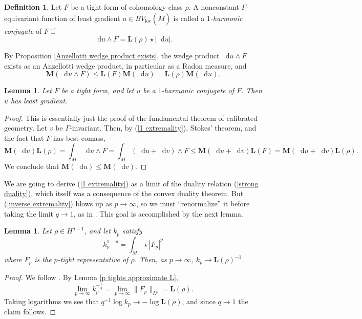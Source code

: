 \documentclass[reqno,11pt]{amsart}
\newcommand*\dif{\mathop{}\!\mathrm{d}}
\newcommand{\Mass}{\mathbf M}
\newcommand{\Comass}{\mathbf L}
\newcommand{\dfn}[1]{\emph{#1}\index{#1}}
\newcommand{\loc}{\mathrm{loc}}
\newtheorem{lemma}[theorem]{Lemma}
\theoremstyle{definition}
\newtheorem{definition}[theorem]{Definition}
\numberwithin{equation}{section}
\begin{document}
\begin{definition}
Let $F$ be a tight form of cohomology class $\rho$.
A nonconstant $\Gamma$-equivariant function of least gradient $u \in BV_\loc(\tilde M)$ is called a \dfn{$1$-harmonic conjugate} of $F$ if
\begin{equation}\label{1 extremality}
\dif u \wedge F = \Comass(\rho) \star |\dif u|.
\end{equation}
\end{definition}

By Proposition \ref{Anzellotti wedge product exists}, the wedge product $\dif u \wedge F$ exists as an Anzellotti wedge product, in particular as a Radon measure, and
$$\Mass(\dif u \wedge F) \leq \Comass(F) \Mass(\dif u) = \Comass(\rho) \Mass(\dif u).$$

\begin{lemma}\label{1 extremality implies least gradient}
Let $F$ be a tight form, and let $u$ be a $1$-harmonic conjugate of $F$.
Then $u$ has least gradient.
\end{lemma}
\begin{proof}
This is essentially just the proof of the fundamental theorem of calibrated geometry.
Let $v$ be $\Gamma$-invariant.
Then, by (\ref{1 extremality}), Stokes' theorem, and the fact that $F$ has best comass,
$$\Mass(\dif u) \Comass(\rho) = \int_M \dif u \wedge F = \int_M (\dif u + \dif v) \wedge F \leq \Mass(\dif u + \dif v) \Comass(F) = \Mass(\dif u + \dif v) \Comass(\rho).$$
We conclude that $\Mass(\dif u) \leq \Mass(\dif v)$.
\end{proof}

We are going to derive (\ref{1 extremality}) as a limit of the duality relation (\ref{strong duality}), which itself was a consequence of the convex duality theorem.
But (\ref{inverse extremality}) blows up as $p \to \infty$, so we must ``renormalize'' it before taking the limit $q \to 1$, as in \cite[\S3.2]{daskalopoulos2020transverse}.
This goal is accomplished by the next lemma.

\begin{lemma}\label{normalizations converge}
Let $\rho \in H^{d - 1}$, and let $k_p$ satisfy 
$$k_p^{1 - p} = \int_M \star |F_p|^p$$
where $F_p$ is the $p$-tight representative of $\rho$.
Then, as $p \to \infty$, $k_p \to \Comass(\rho)^{-1}$.
\end{lemma}
\begin{proof}
We follow \cite[Lemma 3.4]{daskalopoulos2020transverse}.
By Lemma \ref{p tights approximate L},
$$\lim_{p \to \infty} k_p^{-\frac{1}{q}} = \lim_{p \to \infty} \|F_p\|_{L^p} = \Comass(\rho).$$
Taking logarithms we see that $q^{-1} \log k_p \to -\log \Comass(\rho)$, and since $q \to 1$ the claim follows.
\end{proof}
\end{document}
